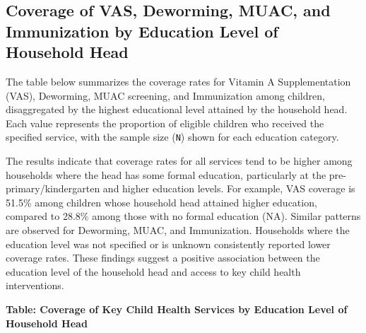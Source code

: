 \documentclass[
  11pt,
]{report}
\begin{document}
\subsection{Coverage of VAS, Deworming, MUAC, and Immunization by
Education Level of Household
Head}\label{coverage-of-vas-deworming-muac-and-immunization-by-education-level-of-household-head}

The table below summarizes the coverage rates for Vitamin A
Supplementation (VAS), Deworming, MUAC screening, and Immunization among
children, disaggregated by the highest educational level attained by the
household head. Each value represents the proportion of eligible
children who received the specified service, with the sample size
(\texttt{N}) shown for each education category.

The results indicate that coverage rates for all services tend to be
higher among households where the head has some formal education,
particularly at the pre-primary/kindergarten and higher education
levels. For example, VAS coverage is 51.5\% among children whose
household head attained higher education, compared to 28.8\% among those
with no formal education (NA). Similar patterns are observed for
Deworming, MUAC, and Immunization. Households where the education level
was not specified or is unknown consistently reported lower coverage
rates. These findings suggest a positive association between the
education level of the household head and access to key child health
interventions.

\textbf{Table: Coverage of Key Child Health Services by Education Level
of Household Head}
\end{document}
